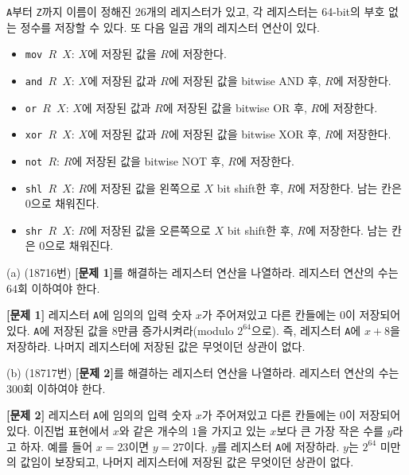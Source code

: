 \begin{problem}
    \texttt{A}부터 \texttt{Z}까지 이름이 정해진 26개의 레지스터가 있고, 각 레지스터는 64-bit의 부호 없는 정수를 저장할 수 있다. 또 다음 일곱 개의 레지스터 연산이 있다.
    \begin{itemize}
        \item \texttt{mov $R$ $X$}: $X$에 저장된 값을 $R$에 저장한다.
        \item \texttt{and $R$ $X$}: $X$에 저장된 값과 $R$에 저장된 값을 bitwise AND 후, $R$에 저장한다.
        \item \texttt{or $R$ $X$}: $X$에 저장된 값과 $R$에 저장된 값을 bitwise OR 후, $R$에 저장한다.
        \item \texttt{xor $R$ $X$}: $X$에 저장된 값과 $R$에 저장된 값을 bitwise XOR 후, $R$에 저장한다.
        \item \texttt{not $R$}: $R$에 저장된 값을 bitwise NOT 후, $R$에 저장한다.
        \item \texttt{shl $R$ $X$}: $R$에 저장된 값을 왼쪽으로 $X$ bit shift한 후, $R$에 저장한다. 남는 칸은 0으로 채워진다.
        \item \texttt{shr $R$ $X$}: $R$에 저장된 값을 오른쪽으로 $X$ bit shift한 후, $R$에 저장한다. 남는 칸은 0으로 채워진다.
    \end{itemize}
    (a) (18716번) \textbf{[문제 1]}를 해결하는 레지스터 연산을 나열하라. 레지스터 연산의 수는 $64$회 이하여야 한다.
    \begin{tcolorbox}[colback=white, colframe=black, sharp corners, boxrule=0.5pt]
        \textbf{[문제 1]}
        레지스터 \texttt{A}에 임의의 입력 숫자 $x$가 주어져있고 다른 칸들에는 0이 저장되어 있다. \texttt{A}에 저장된 값을 $8$만큼 증가시켜라(modulo $2^{64}$으로). 즉, 레지스터 \texttt{A}에 $x+8$을 저장하라. 나머지 레지스터에 저장된 값은 무엇이던 상관이 없다.
    \end{tcolorbox}
    (b) (18717번) \textbf{[문제 2]}를 해결하는 레지스터 연산을 나열하라. 레지스터 연산의 수는 $300$회 이하여야 한다.
    \begin{tcolorbox}[colback=white, colframe=black, sharp corners, boxrule=0.5pt]
        \textbf{[문제 2]}
        레지스터 \texttt{A}에 임의의 입력 숫자 $x$가 주어져있고 다른 칸들에는 0이 저장되어 있다. 이진법 표현에서 $x$와 같은 개수의 $1$을 가지고 있는 $x$보다 큰 가장 작은 수를 $y$라고 하자. 예를 들어 $x=23$이면 $y=27$이다. $y$를 레지스터 \texttt{A}에 저장하라. $y$는 $2^{64}$ 미만의 값임이 보장되고, 나머지 레지스터에 저장된 값은 무엇이던 상관이 없다.
    \end{tcolorbox}
\end{problem}

